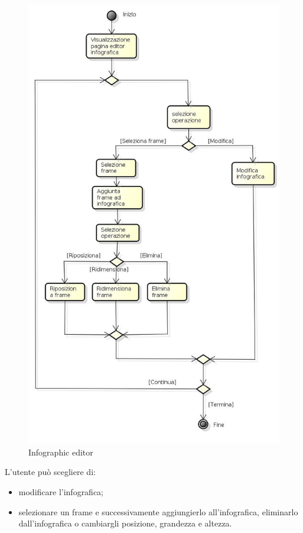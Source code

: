 \begin{figure}[h!]
		\centering
		\includegraphics[scale=.4]{img/attivita/Editor_infografica.jpg}
		\caption{Infographic editor}
		\label{fig:Infografica_editor}
\end{figure}

L'utente può scegliere di: 
\begin{itemize}
\item modificare l'infografica;
\item selezionare un frame e successivamente aggiungierlo all'infografica, eliminarlo dall'infografica o cambiargli posizione, grandezza e altezza.
\end{itemize}

